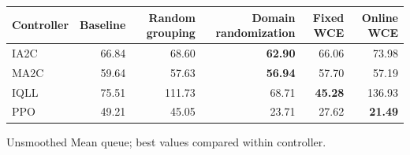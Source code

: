 \begin{tabular}{lrrrrr}
\hline
Controller & Baseline & Random grouping & Domain randomization & Fixed WCE & Online WCE \\
\hline
IA2C & 66.84 & 68.60 & \textbf{62.90} & 66.06 & 73.98 \\
MA2C & 59.64 & 57.63 & \textbf{56.94} & 57.70 & 57.19 \\
IQLL & 75.51 & 111.73 & 68.71 & \textbf{45.28} & 136.93 \\
PPO & 49.21 & 45.05 & 23.71 & 27.62 & \textbf{21.49} \\
\hline
\end{tabular}
Unsmoothed Mean queue; best values compared within controller.
